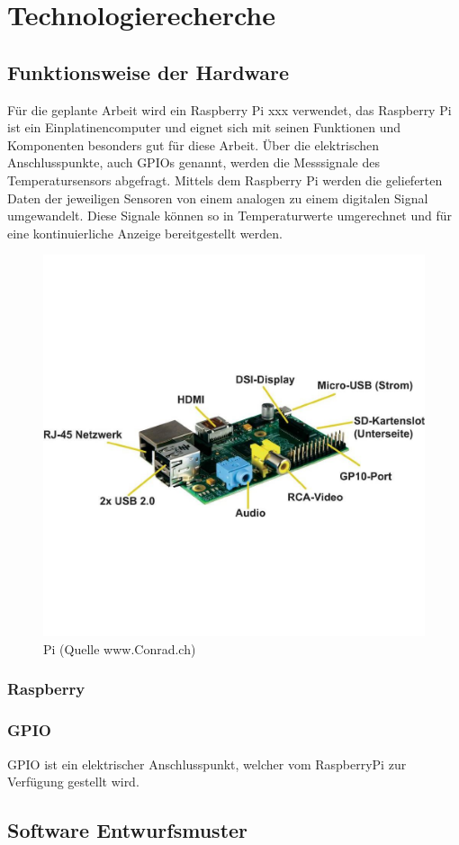 \section{Technologierecherche}
\subsection{Funktionsweise der Hardware}
Für die geplante Arbeit wird ein Raspberry Pi xxx verwendet, das Raspberry Pi ist ein Einplatinencomputer und eignet sich mit seinen Funktionen und Komponenten besonders gut für diese Arbeit. Über die elektrischen Anschlusspunkte, auch GPIOs genannt, werden die Messsignale des Temperatursensors abgefragt. Mittels dem Raspberry Pi werden die gelieferten Daten der jeweiligen Sensoren von einem analogen zu einem digitalen Signal umgewandelt.
Diese Signale können so in Temperaturwerte umgerechnet und für eine kontinuierliche Anzeige bereitgestellt werden.

\begin{figure}[H]%
\centering
\includegraphics[width=1\textwidth]{Images/RaspberryPi.jpg}
\caption{Pi (Quelle www.Conrad.ch)}
\label{fig:raspi}
\end{figure}
\subsubsection{Raspberry}

\subsubsection{GPIO}
GPIO ist ein elektrischer Anschlusspunkt, welcher vom RaspberryPi zur Verfügung gestellt wird.

\subsection{Software Entwurfsmuster}
